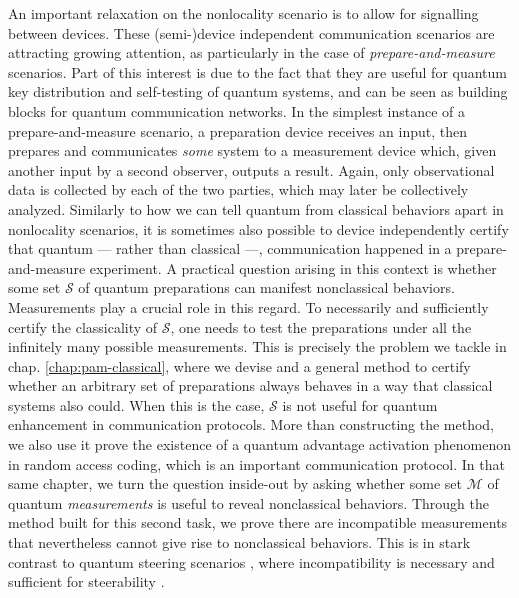 An important relaxation on the nonlocality scenario is to allow for signalling between devices. These (semi-)device independent communication scenarios are attracting growing attention, as particularly in the case of \emph{prepare-and-measure} scenarios. Part of this interest is due to the fact that they are useful for quantum key distribution and self-testing of quantum systems, and can be seen as building blocks for quantum communication networks. In the simplest instance of a prepare-and-measure scenario, a preparation device receives an input, then prepares and communicates \emph{some} system to a measurement device which, given another input by a second observer, outputs a result. Again, only observational data is collected by each of the two parties, which may later be collectively analyzed. Similarly to how we can tell quantum from classical behaviors apart in nonlocality scenarios, it is sometimes also possible to device independently certify that quantum --- rather than classical ---, communication happened in a prepare-and-measure experiment. A practical question arising in this context is whether some set $\mathcal{S}$ of quantum preparations can manifest nonclassical behaviors. Measurements play a crucial role in this regard. To necessarily and sufficiently certify the classicality of $\mathcal{S}$, one needs to test the preparations under all the infinitely many possible measurements. This is precisely the problem we tackle in chap. \ref{chap:pam-classical}, where we devise and a general method to certify whether an arbitrary set of preparations always behaves in a way that classical systems also could. When this is the case, $\mathcal{S}$ is not useful for quantum enhancement in communication protocols. More than constructing the method, we also use it prove the existence of a quantum advantage activation phenomenon in random access coding, which is an important communication protocol. In that same chapter, we turn the question inside-out by asking whether some set $\mathcal{M}$ of quantum \emph{measurements} is useful to reveal nonclassical behaviors. Through the method built for this second task, we prove there are incompatible measurements that nevertheless cannot give rise to nonclassical behaviors. This is in stark contrast to quantum steering scenarios \cite{wiseman_2007_steering,uola_2020_steering,cavalcanti_2016_steering}, where incompatibility is necessary and sufficient for steerability \cite{quintino_incompatibilitysteering_2014,uola_onetoonesteering_2015}.

